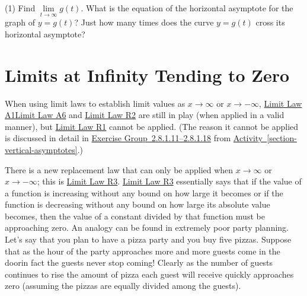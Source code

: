 \documentclass[12pt,]{book}
\theoremstyle{plain}
\theoremstyle{definition}
\theoremstyle{definition}
\theoremstyle{definition}
\theoremstyle{definition}
\theoremstyle{definition}
\numberwithin{equation}{section}
\newcommand{\fe}[2]{#1\mathopen{}\left(#2\right)\mathclose{}}
\begin{document}
\begin{exercisegroup}(1)
\exercise[4.]\hypertarget{exercise-82}{}Find \(\lim\limits_{t\to\infty}\fe{g}{t}\).%
\exercise[5.]\hypertarget{exercise-83}{}What is the equation of the horizontal asymptote for the graph of \(y=\fe{g}{t}\)?%
\exercise[6.]\hypertarget{exercise-84}{}Just how many times does the curve \(y=\fe{g}{t}\) cross its horizontal asymptote?%
\end{exercisegroup}
\par\smallskip\noindent
\typeout{************************************************}
\typeout{************************************************}
\section[{Limits at Infinity Tending to Zero}]{Limits at Infinity Tending to Zero}\label{section-limits-at-infinity-tending-to-zero}
When using limit laws to establish limit values as \(x\to\infty\) or \(x\to-\infty\), \hyperref[lla1]{Limit Law A1}\textendash{}\hyperref[lla6]{Limit Law A6} and  \hyperref[llr2]{Limit Law R2} are still in play (when applied in a valid manner), but \hyperref[llr1]{Limit Law R1} cannot be applied. (The reason it cannot be applied is discussed in detail in \hyperlink{exercisegroup-hear-me}{Exercise Group~2.8.1.11--2.8.1.18} from \hyperref[section-vertical-asymptotes]{Activity~\ref{section-vertical-asymptotes}}.)%
\par
There is a new replacement law that can only be applied when \(x\to\infty\) or \(x\to-\infty\); this is \hyperref[llr3]{Limit Law R3}. \hyperref[llr3]{Limit Law R3} essentially says that if the value of a function is increasing without any bound on how large it becomes or if the function is decreasing without any bound on how large its absolute value becomes, then the value of a constant divided by that function must be approaching zero. An analogy can be found in extremely poor party planning. Let's say that you plan to have a pizza party and you buy five pizzas. Suppose that as the hour of the party approaches more and more guests come in the door\textemdash{}in fact the guests never stop coming! Clearly as the number of guests continues to rise the amount of pizza each guest will receive quickly approaches zero (assuming the pizzas are equally divided among the guests).%
\typeout{************************************************}
\typeout{************************************************}
\end{document}
